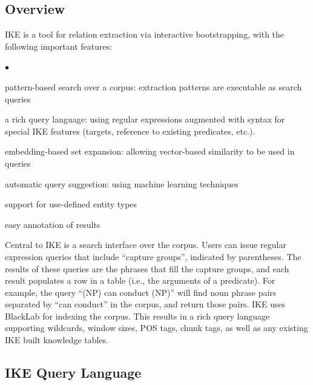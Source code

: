 \documentclass[11pt,letterpaper]{article}
\newcommand{\squishlist}{
   \begin{list}{$\bullet$}
    { \setlength{\itemsep}{-1pt}      \setlength{\parsep}{3pt}
      \setlength{\topsep}{1pt}       \setlength{\partopsep}{0pt}
      \setlength{\leftmargin}{1.5em} \setlength{\labelwidth}{1em}
      \setlength{\labelsep}{0.5em} } }
\newcommand{\squishend}{
    \end{list}  }
\begin{document}
\subsection{Overview}
IKE is a tool for relation extraction via interactive bootstrapping, with the following important features:
\squishlist
 \item pattern-based search over a corpus: extraction patterns are executable as search queries
 \item a rich query language: using regular expressions augmented with syntax for special IKE features (targets, reference to existing predicates, etc.).
 \item embedding-based set expansion: allowing vector-based similarity to be used in queries
 \item automatic query suggestion: using machine learning techniques
 \item support for use-defined entity types
 \item easy annotation of results
\squishend
Central to IKE is a search interface over the corpus. Users can issue regular expression queries that include ``capture groups'', indicated by parentheses. The results of these queries are the phrases that fill the capture groups, and each result populates a row in a table (i.e., the arguments of a predicate). For example, the query ``(NP) can conduct (NP)'' will find noun phrase pairs separated by ``can conduct'' in the corpus, and return those pairs. IKE uses BlackLab \cite{blacklab-tool} for indexing the corpus. This results in a rich query language supporting wildcards, window sizes, POS tags, chunk tags, as well as any existing IKE built knowledge tables. 

\subsection{IKE Query Language}
\end{document}
